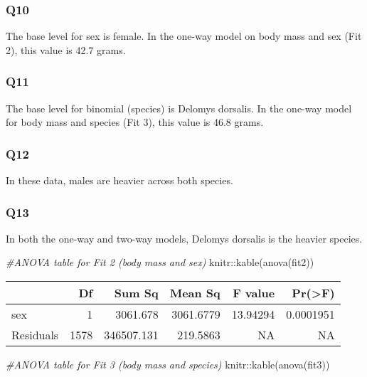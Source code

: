 \documentclass[
]{article}
\newenvironment{Shaded}{\begin{snugshade}}{\end{snugshade}}
\newcommand{\CommentTok}[1]{\textcolor[rgb]{0.56,0.35,0.01}{\textit{#1}}}
\newcommand{\FunctionTok}[1]{\textcolor[rgb]{0.00,0.00,0.00}{#1}}
\newcommand{\NormalTok}[1]{#1}
\newcommand{\SpecialCharTok}[1]{\textcolor[rgb]{0.00,0.00,0.00}{#1}}
\begin{document}
\hypertarget{q10}{%
\subsubsection{Q10}\label{q10}}

The base level for sex is female. In the one-way model on body mass and
sex (Fit 2), this value is 42.7 grams.

\hypertarget{q11}{%
\subsubsection{Q11}\label{q11}}

The base level for binomial (species) is Delomys dorsalis. In the
one-way model for body mass and species (Fit 3), this value is 46.8
grams.

\hypertarget{q12}{%
\subsubsection{Q12}\label{q12}}

In these data, males are heavier across both species.

\hypertarget{q13}{%
\subsubsection{Q13}\label{q13}}

In both the one-way and two-way models, Delomys dorsalis is the heavier
species.

\begin{Shaded}
\begin{Highlighting}[]
\CommentTok{\#ANOVA table for Fit 2 (body mass and sex)}
\NormalTok{knitr}\SpecialCharTok{::}\FunctionTok{kable}\NormalTok{(}\FunctionTok{anova}\NormalTok{(fit2))}
\end{Highlighting}
\end{Shaded}

\begin{longtable}[]{@{}lrrrrr@{}}
\toprule
& Df & Sum Sq & Mean Sq & F value & Pr(\textgreater F) \\
\midrule
\endhead
sex & 1 & 3061.678 & 3061.6779 & 13.94294 & 0.0001951 \\
Residuals & 1578 & 346507.131 & 219.5863 & NA & NA \\
\bottomrule
\end{longtable}

\begin{Shaded}
\begin{Highlighting}[]
\CommentTok{\#ANOVA table for Fit 3 (body mass and species)}
\NormalTok{knitr}\SpecialCharTok{::}\FunctionTok{kable}\NormalTok{(}\FunctionTok{anova}\NormalTok{(fit3))}
\end{Highlighting}
\end{Shaded}
\end{document}
